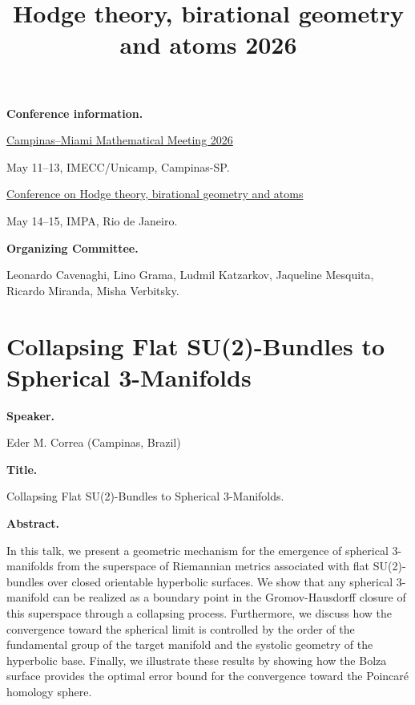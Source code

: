 


\title{Hodge theory, birational geometry
and atoms 2026}
\maketitle
{}
\label{section-phantom}
\tableofcontents

\medskip\noindent
{\bf Conference information.}

\href{%
https://sites.google.com/unicamp.br/%
campinas-miami-math-2026/%
}{Campinas--Miami Mathematical Meeting 2026}

May 11--13, IMECC/Unicamp,
Campinas-SP.

\href{%
https://impa.br/evento/
conference-on-hodge-theory-
birational-geometry-and-atoms/
}{Conference on Hodge theory,
birational geometry and atoms}

May 14--15, IMPA,
Rio de Janeiro.

\medskip\noindent
{\bf Organizing Committee.}

Leonardo Cavenaghi, Lino Grama,
Ludmil Katzarkov, Jaqueline Mesquita,
Ricardo Miranda, Misha Verbitsky.

\section{Collapsing Flat
SU(2)-Bundles to
Spherical 3-Manifolds}
\label{section-spherical-3-manifolds}

\medskip\noindent
{\bf Speaker.}

Eder M. Correa
(Campinas, Brazil)

\medskip\noindent
{\bf Title.}

Collapsing Flat
SU(2)-Bundles to
Spherical 3-Manifolds.

\medskip\noindent
{\bf Abstract.}

In this talk, we present a geometric
mechanism for the emergence of
spherical $3$-manifolds from the
superspace of Riemannian metrics
associated with flat
SU(2)-bundles over closed orientable
hyperbolic surfaces. We show that any
spherical $3$-manifold can be realized
as a boundary point in the
Gromov-Hausdorff closure of this
superspace through a collapsing
process. Furthermore, we discuss how
the convergence toward the spherical
limit is controlled by the order of
the fundamental group of the target
manifold and the systolic geometry of
the hyperbolic base. Finally, we
illustrate these results by showing
how the Bolza surface provides the
optimal error bound for the
convergence toward the Poincar\'e
homology sphere.

